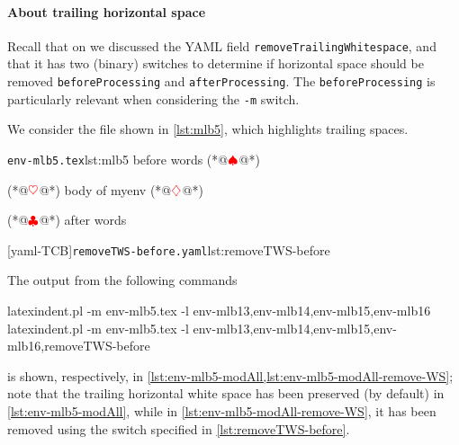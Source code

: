  \paragraph{About trailing horizontal space}
  Recall that on  we discussed the YAML field
  \texttt{removeTrailingWhitespace}, and that it has two (binary) switches to determine
  if horizontal space should be removed \texttt{beforeProcessing} and
  \texttt{afterProcessing}. The \texttt{beforeProcessing} is particularly relevant when
  considering the \texttt{-m} switch.

  \begin{example}
  We consider the file shown in \cref{lst:mlb5}, which highlights trailing spaces.

  \begin{cmhtcbraster}
   \begin{cmhlistings}[style=tcblatex,showspaces=true,escapeinside={(*@}{@*)}]{\texttt{env-mlb5.tex}}{lst:mlb5}
before words   (*@$\color{red}\spadesuit$@*) 
\begin{myenv}           (*@$\color{red}\heartsuit$@*)
body of myenv      (*@$\color{red}\diamondsuit$@*) 
\end{myenv}     (*@$\color{red}\clubsuit$@*)
after words
\end{cmhlistings}
   [yaml-TCB]{\texttt{removeTWS-before.yaml}}{lst:removeTWS-before}
  \end{cmhtcbraster}

  The output from the following commands 
  \begin{widepage}

   \begin{commandshell}
latexindent.pl -m env-mlb5.tex -l env-mlb13,env-mlb14,env-mlb15,env-mlb16
latexindent.pl -m env-mlb5.tex -l env-mlb13,env-mlb14,env-mlb15,env-mlb16,removeTWS-before
\end{commandshell}

  \end{widepage}
  is shown, respectively, in \cref{lst:env-mlb5-modAll,lst:env-mlb5-modAll-remove-WS};
  note that the trailing horizontal white space has been preserved (by default) in
  \cref{lst:env-mlb5-modAll}, while in \cref{lst:env-mlb5-modAll-remove-WS}, it has been
  removed using the switch specified in \cref{lst:removeTWS-before}.

  \begin{widepage}

  \end{widepage}
  \end{example}


